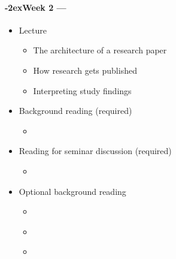 \documentclass[a4paper, 11pt]{article}
\newcommand{\week}[1]{%
  \paragraph*{\kern-2ex\quad #1 --- \syldate{\today}}%


  \ifdim\wd1=\wd\MONDAY
    \AdvanceDate[7]
  \else
    \AdvanceDate[7]
  \fi
}
\begin{document}
\week{Week 2} 
\begin{itemize}
\item Lecture
	\begin{itemize}
	\item The architecture of a research paper
	\item How research gets published
	\item Interpreting study findings
	\end{itemize}
\item Background reading (required)
	\begin{itemize}
	\item \citet[chapters 4--5]{Dollaghan2007a}
	\end{itemize}
\item Reading for seminar discussion (required)
	\begin{itemize}
	\item \citet{Jones2005}
	\end{itemize}
\item Optional background reading
	\begin{itemize}
	\item \citet{Hamilton2005a}
	\item \citet{Hamilton2005b}
	\item \citet{Johnson2006}
	\end{itemize}
\end{itemize}
\end{document}
